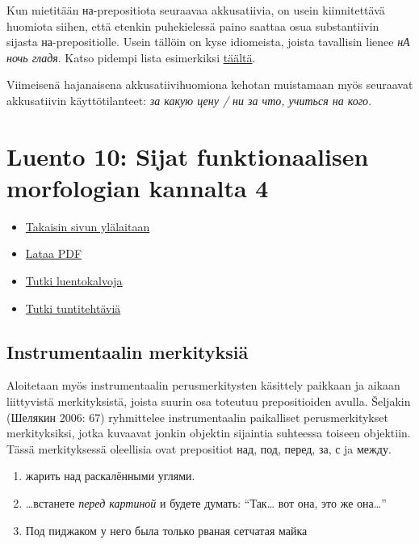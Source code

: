 \documentclass[]{scrartcl}
\providecommand{\tightlist}{%
  \setlength{\itemsep}{0pt}\setlength{\parskip}{0pt}}
\begin{document}
Kun mietitään на-prepositiota seuraavaa akkusatiivia, on usein
kiinnitettävä huomiota siihen, että etenkin puhekielessä paino saattaa
osua substantiivin sijasta на-prepositiolle. Usein tällöin on kyse
idiomeista, joista tavallisin lienee \emph{нА ночь гладя}. Katso pidempi
lista esimerkiksi
\href{http://fonetica.philol.msu.ru/akcent/bezud_slaboud/ud_na_pr.html}{täältä}.

Viimeisenä hajanaisena akkusatiivihuomiona kehotan muistamaan myös
seuraavat akkusatiivin käyttötilanteet: \emph{за какую цену / ни за что,
учиться на кого}.

\section{Luento 10: Sijat funktionaalisen morfologian kannalta
4}\label{luento-10-sijat-funktionaalisen-morfologian-kannalta-4}

\begin{itemize}
\tightlist
\item
  \href{https://mustikka.uta.fi/~juho_harme/morfologia/\#tästä-kurssista}{Takaisin
  sivun ylälaitaan}
\item
  \href{http://mustikka.uta.fi/~juho_harme/morfologia/materiaalit/luento10.pdf}{Lataa
  PDF}
\item
  \href{http://mustikka.uta.fi/~juho_harme/morfologia/presentations/luento10.html}{Tutki
  luentokalvoja}
\item
  \href{http://mustikka.uta.fi/~juho_harme/morfologia/tehtavat/luento10.pdf}{Tutki
  tuntitehtäviä}
\end{itemize}

\subsection{Instrumentaalin
merkityksiä}\label{instrumentaalin-merkityksiuxe4}

Aloitetaan myös instrumentaalin perusmerkitysten käsittely paikkaan ja
aikaan liittyvistä merkityksistä, joista suurin osa toteutuu
prepositioiden avulla. Šeljakin (Шелякин 2006: 67) ryhmittelee
instrumentaalin paikalliset perusmerkitykset merkityksiksi, jotka
kuvaavat jonkin objektin sijaintia suhteessa toiseen objektiin. Tässä
merkityksessä oleellisia ovat prepositiot над, под, перед, за, с ja
между.

\begin{enumerate}
\def\labelenumi{(\arabic{enumi})}
\setcounter{enumi}{129}
\tightlist
\item
  жарить над раскалёнными углями.
\item
  \ldots{}встанете \emph{перед картиной} и будете думать: ``Так\ldots{}
  вот она, это же она\ldots{}''
\item
  Под пиджаком у него была только рваная сетчатая майка
\end{enumerate}
\end{document}
